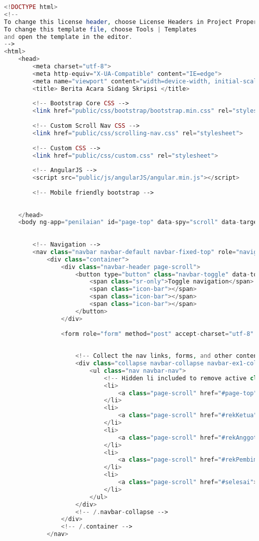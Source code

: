 \begin{lstlisting}[language=PHP,basicstyle=\tiny,caption=skripsi.php]
<!DOCTYPE html>
<!--
To change this license header, choose License Headers in Project Properties.
To change this template file, choose Tools | Templates
and open the template in the editor.
-->
<html>
	<head>
		<meta charset="utf-8">
		<meta http-equiv="X-UA-Compatible" content="IE=edge">
		<meta name="viewport" content="width=device-width, initial-scale=1">
		<title> Berita Acara Sidang Skripsi </title>
		
		<!-- Bootstrap Core CSS -->
		<link href="public/css/bootstrap/bootstrap.min.css" rel="stylesheet">
		
		<!-- Custom Scroll Nav CSS -->
		<link href="public/css/scrolling-nav.css" rel="stylesheet">
		
		<!-- Custom CSS -->
		<link href="public/css/custom.css" rel="stylesheet">
		
		<!-- AngularJS -->
		<script src="public/js/angularJS/angular.min.js"></script>
		
		<!-- Mobile friendly bootstrap -->
		
		
	</head>
	<body ng-app="penilaian" id="page-top" data-spy="scroll" data-target=".navbar-fixed-top">
	
	
		<!-- Navigation -->
		<nav class="navbar navbar-default navbar-fixed-top" role="navigation">
			<div class="container">
				<div class="navbar-header page-scroll">
					<button type="button" class="navbar-toggle" data-toggle="collapse" data-target=".navbar-ex1-collapse">
						<span class="sr-only">Toggle navigation</span>
						<span class="icon-bar"></span>
						<span class="icon-bar"></span>
						<span class="icon-bar"></span>
					</button>
				</div>
				
				<form role="form" method="post" accept-charset="utf-8" action="<?php echo base_url() . "index.php/c_skripsi/tambahDataMahasiswa" ?>" ng-controller="DefaultValue" onsubmit="return confirm('Apakah anda yakin?');">
					
					
					<!-- Collect the nav links, forms, and other content for toggling -->
					<div class="collapse navbar-collapse navbar-ex1-collapse">
						<ul class="nav navbar-nav">
							<!-- Hidden li included to remove active class from about link when scrolled up past about section -->
							<li>
								<a class="page-scroll" href="#page-top">Berita Acara Sidang Skripsi</a>
							</li>
							<li>
								<a class="page-scroll" href="#rekKetua">Lembar Rekapitulasi Ketua Tim Penguji</a>
							</li>
							<li>
								<a class="page-scroll" href="#rekAnggota">Lembar Rekapitulasi Anggota Tim Penguji</a>
							</li>
							<li>
								<a class="page-scroll" href="#rekPembimbing">Lembar Rekapitulasi Pembimbing</a>
							</li>
							<li>
								<a class="page-scroll" href="#selesai">Selesai</a>
							</li>
						</ul>
					</div>
					<!-- /.navbar-collapse -->
				</div>
				<!-- /.container -->
			</nav>
			

\end{lstlisting}
